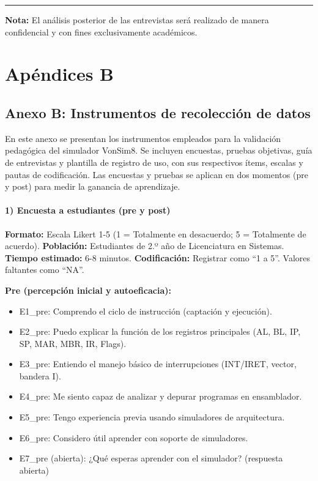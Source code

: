 \documentclass[12pt,oneside]{templates/unerthesis}
\providecommand{\tightlist}{%
  \setlength{\itemsep}{0pt}\setlength{\parskip}{0pt}}
\begin{document}
\begin{center}\rule{0.5\linewidth}{0.5pt}\end{center}

\textbf{Nota:} El análisis posterior de las entrevistas será realizado de manera confidencial y con fines exclusivamente académicos.

\hypertarget{apuxe9ndices-b}{%
\chapter*{Apéndices B}\label{apuxe9ndices-b}}

\hypertarget{anexoB}{%
\section{Anexo B: Instrumentos de recolección de datos}\label{anexoB}}

En este anexo se presentan los instrumentos empleados para la validación pedagógica del simulador VonSim8. Se incluyen encuestas, pruebas objetivas, guía de entrevistas y plantilla de registro de uso, con sus respectivos ítems, escalas y pautas de codificación. Las encuestas y pruebas se aplican en dos momentos (pre y post) para medir la ganancia de aprendizaje.

\hypertarget{encuesta-a-estudiantes-pre-y-post}{%
\subsubsection{1) Encuesta a estudiantes (pre y post)}\label{encuesta-a-estudiantes-pre-y-post}}

\textbf{Formato:} Escala Likert 1-5 (1 = Totalmente en desacuerdo; 5 = Totalmente de acuerdo).
\textbf{Población:} Estudiantes de 2.º año de Licenciatura en Sistemas.
\textbf{Tiempo estimado:} 6-8 minutos.
\textbf{Codificación:} Registrar como ``1 a 5''. Valores faltantes como ``NA''.

\textbf{Pre (percepción inicial y autoeficacia):}

\begin{itemize}
\tightlist
\item
  E1\_pre: Comprendo el ciclo de instrucción (captación y ejecución).
\item
  E2\_pre: Puedo explicar la función de los registros principales (AL, BL, IP, SP, MAR, MBR, IR, Flags).
\item
  E3\_pre: Entiendo el manejo básico de interrupciones (INT/IRET, vector, bandera I).
\item
  E4\_pre: Me siento capaz de analizar y depurar programas en ensamblador.
\item
  E5\_pre: Tengo experiencia previa usando simuladores de arquitectura.
\item
  E6\_pre: Considero útil aprender con soporte de simuladores.
\item
  E7\_pre (abierta): ¿Qué esperas aprender con el simulador? (respuesta abierta)
\end{itemize}
\end{document}
